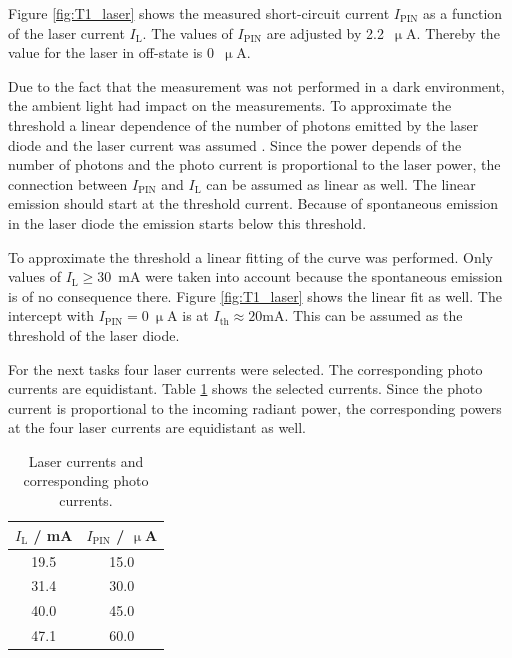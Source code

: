 Figure \ref{fig:T1_laser} shows the measured short-circuit current $I_{\mathrm{PIN}}$ as a function of the laser current $I_{\mathrm{L}}$. The values of $I_{\mathrm{PIN}}$ are adjusted by 2.2~$\upmu$A. Thereby the value for the laser in off-state is 0~$\upmu$A.

Due to the fact that the measurement was not performed in a dark environment, the ambient light had impact on the measurements. To approximate the threshold a linear dependence of the number of photons emitted by the laser diode and the laser current was assumed \footnotemark[1]. Since the power depends of the number of photons and the photo current is proportional to the laser power, the connection between $I_{\mathrm{PIN}}$ and $I_{\mathrm{L}}$ can be assumed as linear as well. The linear emission should start at the threshold current. Because of spontaneous emission in the laser diode the emission starts below this threshold.

To approximate the threshold a linear fitting of the curve was performed. Only values of $I_{\mathrm{L}} \geq 30$~mA were taken into account because the spontaneous emission is of no consequence there. Figure \ref{fig:T1_laser} shows the linear fit as well. The intercept with $I_{\mathrm{PIN}} = 0~\upmu$A is at $I_{\mathrm{th}} \approx 20$mA. This can be assumed as the threshold of the laser diode.



For the next tasks four laser currents were selected. The corresponding photo currents are equidistant. Table \ref{tab:T1_values} shows the selected currents. Since the photo current is proportional to the incoming radiant power, the corresponding powers at the four laser currents are equidistant as well.


\begin{table}%
\centering
\caption{Laser currents and corresponding photo currents.}

\begin{tabular}{cc}

\toprule
$I_{\mathrm{L}}$ / mA	&	$I_{\mathrm{PIN}}$ / $\upmu$A\\

\midrule

19.5&15.0\\
31.4&30.0\\
40.0&45.0\\
47.1&60.0\\
\bottomrule 
\end{tabular}
\label{tab:T1_values}
\end{table}

